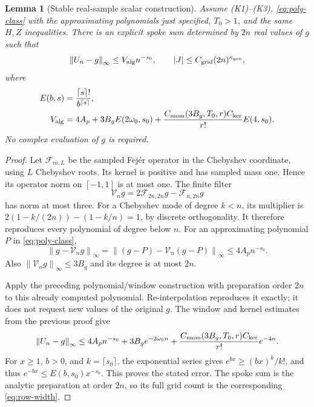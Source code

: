 \documentclass[11pt,letterpaper]{article}
\newcommand{\norm}[1]{\left\lVert#1\right\rVert}
\newtheorem{lemma}{Lemma}[section]
\theoremstyle{definition}
\theoremstyle{remark}
\begin{document}
\begin{lemma}[Stable real-sample scalar construction]\label{thm:algebraic-row}
Assume (K1)--(K3), \eqref{eq:poly-class} with the approximating polynomials just specified,
\(T_0>1\), and the same \(H,Z\) inequalities.
There is an explicit spoke sum determined by \(2n\) real values of \(g\) such that
\[
 \norm{U_n-g}_\infty\le V_{\rm alg} n^{-s_0},\qquad
 |J|\le C_{\rm grid}(2n)^{\kappa_{\rm gen}},
\]
where
\begin{align*}
 E(b,s)&=\frac{\lceil s\rceil!}{b^{\lceil s\rceil}},\\
 V_{\rm alg}
 &=4A_p+3B_g E(2\omega_0,s_0)
       +\frac{C_{\rm mom}(3B_g,T_0,r)C_{\rm ker}}{r!}E(4,s_0).
\end{align*}
No complex evaluation of \(g\) is required.
\end{lemma}
\begin{proof}
Let \(\mathcal F_{m,L}\) be the sampled Fej\'er operator in the Chebyshev
coordinate, using \(L\) Chebyshev roots. Its kernel is positive and has
sampled mass one. Hence its operator norm on \([-1,1]\) is at most one.
The finite filter
\[
 \mathcal V_ng=2\mathcal F_{2n,2n}g-\mathcal F_{n,2n}g
\]
has norm at most three. For a Chebyshev mode of degree \(k<n\), its multiplier
is \(2(1-k/(2n))-(1-k/n)=1\), by discrete orthogonality.
It therefore reproduces every polynomial of degree below \(n\).
For an approximating polynomial \(P\) in \eqref{eq:poly-class},
\[
 \norm{g-\mathcal V_ng}_\infty
 =\norm{(g-P)-\mathcal V_n(g-P)}_\infty\le4A_pn^{-s_0}.
\]
Also \(\norm{\mathcal V_ng}_\infty\le3B_g\) and its degree is at most \(2n\).

Apply the preceding polynomial/window construction with preparation order
\(2n\) to this already computed polynomial. Re-interpolation reproduces it
exactly; it does not request new values of the original \(g\).
The window and kernel estimates from the previous proof give
\[
 \norm{U_n-g}_\infty
 \le4A_pn^{-s_0}+3B_ge^{-2\omega_0n}
       +\frac{C_{\rm mom}(3B_g,T_0,r)C_{\rm ker}}{r!}e^{-4n}.
\]
For \(x\ge1\), \(b>0\), and \(k=\lceil s_0\rceil\), the exponential series
gives \(e^{bx}\ge(bx)^k/k!\), and thus
\(e^{-bx}\le E(b,s_0)x^{-s_0}\).
This proves the stated error. The spoke sum is the analytic preparation at order
\(2n\), so its full grid count is the corresponding \eqref{eq:row-width}.
\end{proof}
\end{document}
